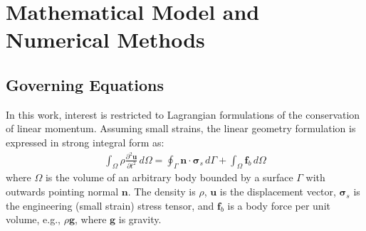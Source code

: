 \documentclass[sn-mathphys,Numbered]{sn-jnl}%
\newcommand{\bb}{\boldsymbol}
\begin{document}
\section{Mathematical Model and Numerical Methods}\label{sec:math_model}

%

\subsection{Governing Equations} \label{sec:governing_eqn}

In this work, interest is restricted to Lagrangian formulations of the conservation of linear momentum.
Assuming small strains, the linear geometry formulation is expressed in strong integral form as:
\begin{eqnarray} \label{eqn:momentum_lingeom}
    \int_{\Omega} \rho \frac{\partial^2 \bb{u} }{\partial t^2} \, d\Omega
    =
    \oint_{\Gamma} \bb{n} \cdot \bb{\sigma}_s \,  d\Gamma
    + \int_{\Omega}  \bb{f}_b \, d\Omega
\end{eqnarray}
where $\Omega$ is the volume of an arbitrary body bounded by a surface $\Gamma$ with outwards pointing normal $\bb{n}$.
The density is $\rho$, $\bb{u}$ is the displacement vector, $\bb{\sigma}_s$ is the engineering (small strain) stress tensor, and $\bb{f}_b$ is a body force per unit volume, e.g., $\rho \bb{g}$, where $\bb{g}$ is gravity.
\end{document}
